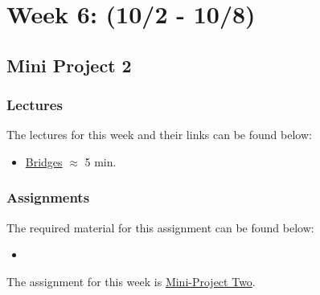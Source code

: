 \clearpage
\chapter{Week 6: (10/2 - 10/8)}

\section{Mini Project 2}

\subsection{Lectures}

The lectures for this week and their links can be found below:

\begin{itemize}
    \item \href{https://www.youtube.com/watch?v=nZwSo4vfw6c}{Bridges} $\approx$ 5 min.
\end{itemize}

\subsection{Assignments}

The required material for this assignment can be found below:

\begin{itemize}
    \item {}
\end{itemize}

The assignment for this week is \href{https://applied.cs.colorado.edu/mod/quiz/view.php?id=49369}{Mini-Project Two}.  